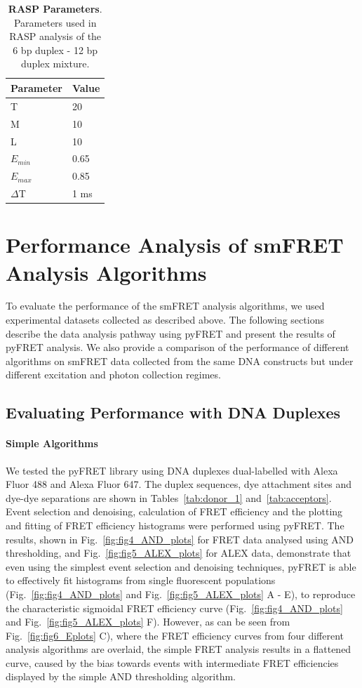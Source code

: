 \begin{table}[!ht]
\caption{
{\bf{RASP Parameters}}. Parameters used in RASP analysis of the 6 bp duplex - 12 bp duplex mixture.}
\begin{tabular}{|l|l|}
\hline
Parameter & Value \\
\hline
T & 20 \\
M & 10 \\
L & 10 \\
$E_{min}$ & 0.65 \\
$E_{max}$ & 0.85 \\
$\Delta$T & 1 ms \\
\hline
\end{tabular}

\label{tab:RASP}
\end{table}

\section{Performance Analysis of smFRET Analysis Algorithms}
To evaluate the performance of the smFRET analysis algorithms, we used experimental datasets collected as described above. The following sections describe the data analysis pathway using pyFRET and present the results of pyFRET analysis. We also provide a comparison of the performance of different algorithms on smFRET data collected from the same DNA constructs but under different excitation and photon collection regimes.

\subsection{Evaluating Performance with DNA Duplexes}
\paragraph{Simple Algorithms}
We tested the pyFRET library using DNA duplexes dual-labelled with Alexa Fluor 488 and Alexa Fluor 647. The duplex sequences, dye attachment sites and dye-dye separations are shown in Tables~\ref{tab:donor_1} and~\ref{tab:acceptors}. Event selection and denoising, calculation of FRET efficiency and the plotting and fitting of FRET efficiency histograms were performed using pyFRET. The results, shown in Fig.~\ref{fig:fig4_AND_plots} for FRET data analysed using AND thresholding, and Fig.~\ref{fig:fig5_ALEX_plots} for ALEX data, demonstrate that even using the simplest event selection and denoising techniques, pyFRET is able to effectively fit histograms from single fluorescent populations (Fig.~\ref{fig:fig4_AND_plots} and Fig.~\ref{fig:fig5_ALEX_plots} A - E), to reproduce the characteristic sigmoidal FRET efficiency curve (Fig.~\ref{fig:fig4_AND_plots} and Fig.~\ref{fig:fig5_ALEX_plots} F). However, as can be seen from Fig.~\ref{fig:fig6_Eplots} C), where the FRET efficiency curves from four different analysis algorithms are overlaid, the simple FRET analysis results in a flattened curve, caused by the bias towards events with intermediate FRET efficiencies displayed by the simple AND thresholding algorithm. 

